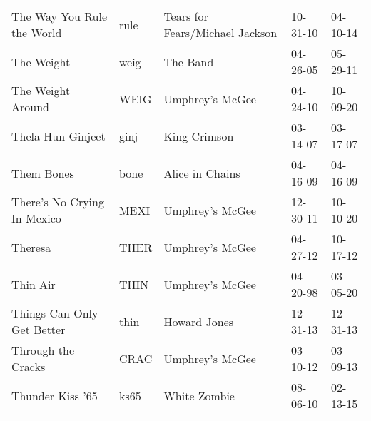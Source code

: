 \begin{longtable}{p{}p{}p{}p{}p{}}
                                              The Way You Rule the World &          rule &                          Tears for Fears/Michael Jackson &              10-31-10 &             04-10-14 \\
                                                              The Weight &          weig &                                                 The Band &              04-26-05 &             05-29-11 \\
                                                       The Weight Around &          WEIG &                                          Umphrey's McGee &              04-24-10 &             10-09-20 \\
                                                       Thela Hun Ginjeet &          ginj &                                             King Crimson &              03-14-07 &             03-17-07 \\
                                                              Them Bones &          bone &                                          Alice in Chains &              04-16-09 &             04-16-09 \\
                                             There's No Crying In Mexico &          MEXI &                                          Umphrey's McGee &              12-30-11 &             10-10-20 \\
                                                                 Theresa &          THER &                                          Umphrey's McGee &              04-27-12 &             10-17-12 \\
                                                                Thin Air &          THIN &                                          Umphrey's McGee &              04-20-98 &             03-05-20 \\
                                              Things Can Only Get Better &          thin &                                             Howard Jones &              12-31-13 &             12-31-13 \\
                                                      Through the Cracks &          CRAC &                                          Umphrey's McGee &              03-10-12 &             03-09-13 \\
                                                        Thunder Kiss '65 &          ks65 &                                             White Zombie &              08-06-10 &             02-13-15 \\

\end{longtable}
